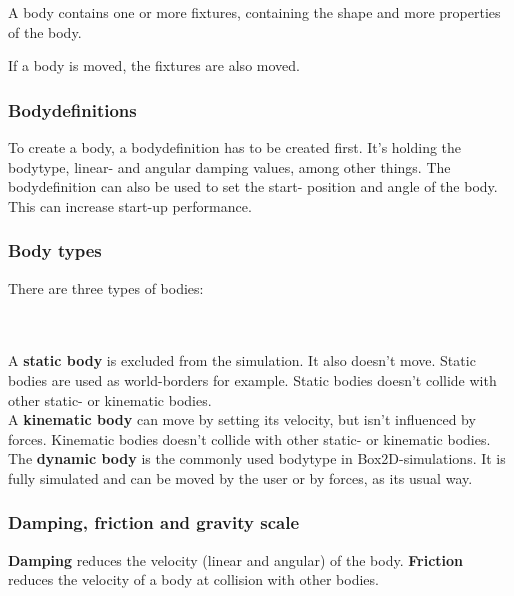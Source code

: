 \documentclass[10pt,a4paper,DIV=11]{scrreprt}
\begin{document}
A body contains one or more fixtures, containing the shape and more properties of the body.

If a body is moved, the fixtures are also moved.

\subsubsection*{Bodydefinitions}
To create a body, a bodydefinition has to be created first. It's holding the bodytype, linear- and angular damping values, among other things.
The bodydefinition can also be used to set the start- position and angle of the body. This can increase start-up performance.

\subsubsection*{Body types}
There are three types of bodies:

   \\
\\

A \textbf{static body} is excluded from the simulation. It also doesn't move. Static bodies are used as world-borders for example. Static bodies doesn't collide with other static- or kinematic bodies. \\

A \textbf{kinematic body} can move by setting its velocity, but isn't influenced by forces.
Kinematic bodies doesn't collide with other static- or kinematic bodies.\\

The \textbf{dynamic body} is the commonly used bodytype in Box2D-simulations. It is fully simulated and can be moved by the user or by forces, as its usual way.

\subsubsection*{Damping, friction and gravity scale}
\textbf{Damping} reduces the velocity (linear and angular) of the body.
\textbf{Friction} reduces the velocity of a body at collision with other bodies.
\end{document}
